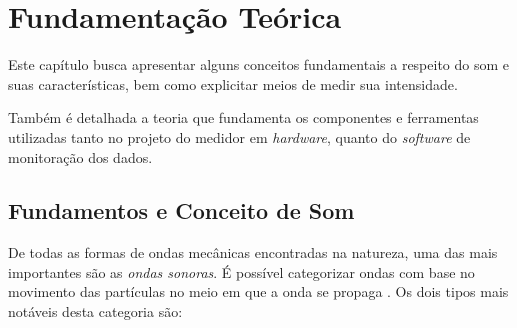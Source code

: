 \documentclass[
    12pt,               %
    openright,          %
    oneside,
    a4paper,            
    english,            %
    brazil              %
    ]{abntex2}
\begin{document}
\chapter{Fundamentação Teórica}\label{teoria}

Este capítulo busca apresentar alguns conceitos fundamentais a respeito do som e suas características, bem como explicitar meios de medir sua intensidade. 

Também é detalhada a teoria que fundamenta os componentes e ferramentas utilizadas tanto no projeto do medidor em \textit{hardware}, quanto do \textit{software} de monitoração dos dados.



\section{Fundamentos e Conceito de Som}\label{som-definicao}

De todas as formas de ondas mecânicas encontradas na natureza, uma das mais importantes são as \textit{ondas sonoras}. É possível categorizar ondas com base no movimento das partículas no meio em que a onda se propaga \cite{halliday}. Os dois tipos mais notáveis desta categoria são:
\end{document}
